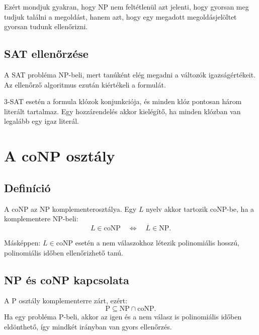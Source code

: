 Ezért mondjuk gyakran, hogy $\mathrm{NP}$ nem feltétlenül azt jelenti, hogy gyorsan meg tudjuk találni a megoldást, hanem azt, hogy egy megadott megoldásjelöltet gyorsan tudunk ellenőrizni.

\subsection{SAT ellenőrzése}

A SAT probléma $\mathrm{NP}$-beli, mert tanúként elég megadni a változók igazságértékeit. Az ellenőrző algoritmus ezután kiértékeli a formulát.

3-SAT esetén a formula klózok konjunkciója, és minden klóz pontosan három literált tartalmaz. Egy hozzárendelés akkor kielégítő, ha minden klózban van legalább egy igaz literál.


\begin{center}

\end{center}

\section{A coNP osztály}

\subsection{Definíció}

A $\mathrm{coNP}$ az $\mathrm{NP}$ komplementerosztálya. Egy $L$ nyelv akkor tartozik $\mathrm{coNP}$-be, ha a komplementere $\mathrm{NP}$-beli:
\[
  L\in\mathrm{coNP}
  \quad\Longleftrightarrow\quad
  \overline L\in\mathrm{NP}.
\]

Másképpen: $L\in\mathrm{coNP}$ esetén a nem válaszokhoz létezik polinomiális hosszú, polinomiális időben ellenőrizhető tanú.

\subsection{NP és coNP kapcsolata}

A $\mathrm{P}$ osztály komplementerre zárt, ezért:
\[
  \mathrm{P}\subseteq\mathrm{NP}\cap\mathrm{coNP}.
\]
Ha egy probléma $\mathrm{P}$-beli, akkor az igen és a nem válasz is polinomiális időben eldönthető, így mindkét irányban van gyors ellenőrzés.

